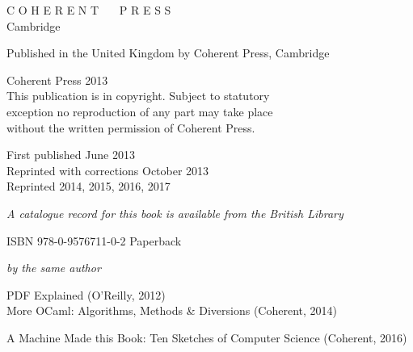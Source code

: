 \documentclass[]{book}
\newcommand{\smspace}{\vspace{4mm}}
\begin{document}
\thispagestyle{empty}

{\centering

\vspace{10mm}


\noindent C O H E R E N T \ \ \ P R E S S\\ \vspace{1mm} \footnotesize Cambridge

\vspace{3mm}

\noindent Published in the United Kingdom by Coherent Press, Cambridge

\vspace{3mm}

\noindent {\small \copyright} Coherent Press 2013\\

\vspace{3mm}
\noindent This publication is in copyright. Subject to statutory\\ exception no reproduction of any part may take place\\ without the written permission of Coherent Press.\\

\vspace{3mm}

\noindent First published June 2013\\
\noindent Reprinted with corrections October 2013\\
\noindent Reprinted 2014, 2015, 2016, 2017

\vspace{3mm}



\noindent \textit{A catalogue record for this book is available from the British Library}\\

\smspace

\noindent ISBN 978-0-9576711-0-2 Paperback\\


\vspace{20mm}

\noindent \textit{by the same author}\\

\smspace

PDF Explained (O'Reilly, 2012)\\

\vspace{1mm}
More OCaml: Algorithms, Methods \& Diversions (Coherent, 2014) 

\vspace{1mm}
A Machine Made this Book: Ten Sketches of Computer Science (Coherent, 2016)

}
\cleardoublepage
\end{document}
